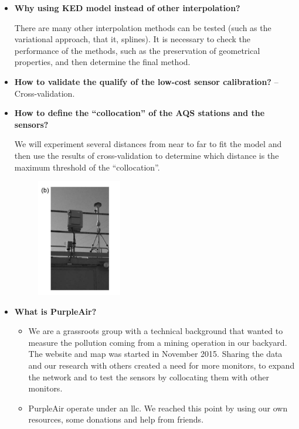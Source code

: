 \documentclass{article}
\begin{document}
\begin{itemize}
    \item \textbf{Why using KED model instead of other interpolation?} {
    
    There are many other interpolation methods can be tested (such as the variational approach, that it, splines). It is necessary to check the performance of the methods, such as the preservation of geometrical properties, and then determine the final method.
    }
    \item \textbf{How to validate the qualify of the low-cost sensor calibration?} -- Cross-validation.
    \item \textbf{How to define the ``collocation'' of the AQS stations and the sensors?} {
    
    We will experiment several distances from near to far to fit the model and then use the results of cross-validation to determine which distance is the maximum threshold of the ``collocation''.
    \begin{figure}[H]
        \centering
        \includegraphics[width=0.35\textwidth]{img/collocation.png}
        \label{fig:col}
    \end{figure}
    }
    \item \textbf{What is PurpleAir?}
        \begin{itemize}
            \item We are a grassroots group with a technical background that wanted to measure the pollution coming from a mining operation in our backyard. The website and map was started in November 2015. Sharing the data and our research with others created a need for more monitors, to expand the network and to test the sensors by collocating them with other monitors.
            \item PurpleAir operate under an llc. We reached this point by using our own resources, some donations and help from friends.

\end{itemize}
\end{itemize}
\end{document}
